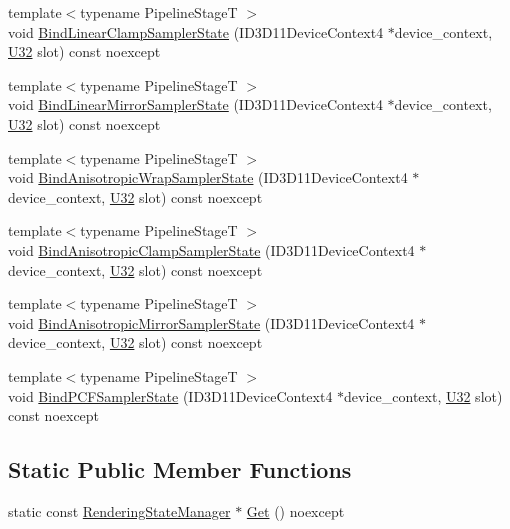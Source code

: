 \begin{DoxyCompactItemize}
\item 
{\footnotesize template$<$typename Pipeline\+StageT $>$ }\\void \hyperlink{classmage_1_1_rendering_state_manager_a9970652cbdd9ce2b1209d25026f77edd}{Bind\+Linear\+Clamp\+Sampler\+State} (I\+D3\+D11\+Device\+Context4 $\ast$device\+\_\+context, \hyperlink{namespacemage_a41c104c036fba3756a74e19f793eeaa1}{U32} slot) const noexcept
\item 
{\footnotesize template$<$typename Pipeline\+StageT $>$ }\\void \hyperlink{classmage_1_1_rendering_state_manager_aae8ab867cf722e33e8574bd642d64b03}{Bind\+Linear\+Mirror\+Sampler\+State} (I\+D3\+D11\+Device\+Context4 $\ast$device\+\_\+context, \hyperlink{namespacemage_a41c104c036fba3756a74e19f793eeaa1}{U32} slot) const noexcept
\item 
{\footnotesize template$<$typename Pipeline\+StageT $>$ }\\void \hyperlink{classmage_1_1_rendering_state_manager_a77b426571395346f399ccb9cae5a7db9}{Bind\+Anisotropic\+Wrap\+Sampler\+State} (I\+D3\+D11\+Device\+Context4 $\ast$device\+\_\+context, \hyperlink{namespacemage_a41c104c036fba3756a74e19f793eeaa1}{U32} slot) const noexcept
\item 
{\footnotesize template$<$typename Pipeline\+StageT $>$ }\\void \hyperlink{classmage_1_1_rendering_state_manager_a56b9dff8574613095a8a126aaff97803}{Bind\+Anisotropic\+Clamp\+Sampler\+State} (I\+D3\+D11\+Device\+Context4 $\ast$device\+\_\+context, \hyperlink{namespacemage_a41c104c036fba3756a74e19f793eeaa1}{U32} slot) const noexcept
\item 
{\footnotesize template$<$typename Pipeline\+StageT $>$ }\\void \hyperlink{classmage_1_1_rendering_state_manager_add44b29e48dc772f106f1b37345a0dab}{Bind\+Anisotropic\+Mirror\+Sampler\+State} (I\+D3\+D11\+Device\+Context4 $\ast$device\+\_\+context, \hyperlink{namespacemage_a41c104c036fba3756a74e19f793eeaa1}{U32} slot) const noexcept
\item 
{\footnotesize template$<$typename Pipeline\+StageT $>$ }\\void \hyperlink{classmage_1_1_rendering_state_manager_ad8d80be6bbf83e2626de777963ff62ab}{Bind\+P\+C\+F\+Sampler\+State} (I\+D3\+D11\+Device\+Context4 $\ast$device\+\_\+context, \hyperlink{namespacemage_a41c104c036fba3756a74e19f793eeaa1}{U32} slot) const noexcept
\end{DoxyCompactItemize}
\subsection*{Static Public Member Functions}
\begin{DoxyCompactItemize}
\item 
static const \hyperlink{classmage_1_1_rendering_state_manager}{Rendering\+State\+Manager} $\ast$ \hyperlink{classmage_1_1_rendering_state_manager_aeea3332b821a6519e81ae7de1cbafecb}{Get} () noexcept
\end{DoxyCompactItemize}
